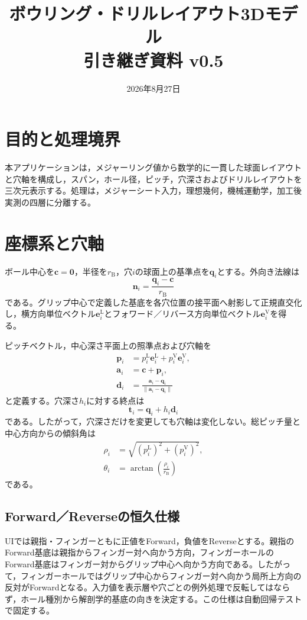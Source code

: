 \documentclass[a4paper,11pt]{ltjsarticle}
\title{ボウリング・ドリルレイアウト3Dモデル\\引き継ぎ資料 v0.5}
\date{2026年8月27日}
\newcommand{\vect}[1]{\bm{#1}}
\begin{document}
\maketitle

\section{目的と処理境界}
本アプリケーションは，メジャーリング値から数学的に一貫した球面レイアウトと穴軸を構成し，スパン，ホール径，ピッチ，穴深さおよびドリルレイアウトを三次元表示する。処理は，メジャーシート入力，理想幾何，機械運動学，加工後実測の四層に分離する。

\section{座標系と穴軸}
ボール中心を\(\vect c=\vect 0\)，半径を\(r_{\mathrm B}\)，穴\(i\)の球面上の基準点を\(\vect q_i\)とする。外向き法線は
\begin{equation}
\vect n_i=\frac{\vect q_i-\vect c}{r_{\mathrm B}}
\end{equation}
である。グリップ中心で定義した基底を各穴位置の接平面へ射影して正規直交化し，横方向単位ベクトル\(\vect e_i^{\mathrm L}\)とフォワード／リバース方向単位ベクトル\(\vect e_i^{\mathrm V}\)を得る。

ピッチベクトル，中心深さ平面上の照準点および穴軸を
\begin{align}
\vect p_i&=p_i^{\mathrm L}\vect e_i^{\mathrm L}+p_i^{\mathrm V}\vect e_i^{\mathrm V},\\
\vect a_i&=\vect c+\vect p_i,\\
\vect d_i&=\frac{\vect a_i-\vect q_i}{\lVert\vect a_i-\vect q_i\rVert}
\end{align}
と定義する。穴深さ\(h_i\)に対する終点は
\begin{equation}
\vect t_i=\vect q_i+h_i\vect d_i
\end{equation}
である。したがって，穴深さだけを変更しても穴軸は変化しない。総ピッチ量と中心方向からの傾斜角は
\begin{align}
\rho_i&=\sqrt{\left(p_i^{\mathrm L}\right)^2+\left(p_i^{\mathrm V}\right)^2},\\
\theta_i&=\arctan\left(\frac{\rho_i}{r_{\mathrm B}}\right)
\end{align}
である。

\subsection{Forward／Reverseの恒久仕様}
UIでは親指・フィンガーともに正値をForward，負値をReverseとする。親指のForward基底は親指からフィンガー対へ向かう方向，フィンガーホールのForward基底はフィンガー対からグリップ中心へ向かう方向である。したがって，フィンガーホールではグリップ中心からフィンガー対へ向かう局所上方向の反対がForwardとなる。入力値を表示層や穴ごとの例外処理で反転してはならず，ホール種別から解剖学的基底の向きを決定する。この仕様は自動回帰テストで固定する。
\end{document}
